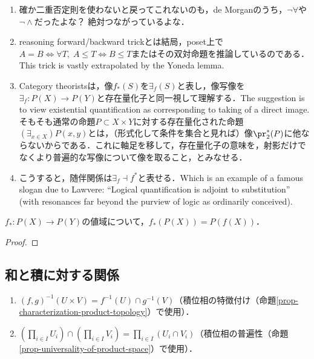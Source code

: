 \documentclass[uplatex,dvipdfmx]{jsreport}
\begin{document}
\begin{remarks}\mbox{}
    \begin{enumerate}
        \item 確か二重否定則を使わないと戻ってこれないのも，de Morganのうち，$\lnot\forall$や$\lnot\land$だったよな？
        絶対つながっているよな．
        \item reasoning forward/backward trickとは結局，poset上で$A=B\iff\forall T,\;A\le T\Leftrightarrow B\le T$またはその双対命題を推論しているのである．This trick is vastly extrapolated by the Yoneda lemma.
        \item Category theoristsは，像$f_*(S)$を$\exists_f(S)$と表し，像写像を$\exists_f:P(X)\to P(Y)$と存在量化子と同一視して理解する．The suggestion is to view existential quantification as corresponding to taking of a direct image. そもそも通常の命題$P\subset X\times Y$に対する存在量化された命題$(\exists_{x\in X}) P(x,y)$とは，（形式化して条件を集合と見れば）像$\pr_2^*(P)$に他ならないからである．これに軸足を移して，存在量化子の意味を，射影だけでなくより普遍的な写像について像を取ること，とみなせる．
        \item こうすると，随伴関係は$\exists_f\dashv f^*$と表せる．Which is an example of a famous slogan due to Lawvere: “Logical quantification is adjoint to substitution” (with resonances far beyond the purview of logic as ordinarily conceived).
    \end{enumerate}
\end{remarks}

\begin{problem}[A2.5.3]
    $f_*:P(X)\to P(Y)$の値域について，$f_*(P(X))=P(f(X))$．
\end{problem}
\begin{proof}
    
\end{proof}

\subsection{和と積に対する関係}

\begin{lemma}\mbox{}\label{lemma-preimage-and-product}
    \begin{enumerate}
        \item $(f,g)^{-1}(U\times V)=f^{-1}(U)\cap g^{-1}(V)$（積位相の特徴付け（命題\ref{prop-characterization-product-topology}）で使用）．
        \item $(\prod_{i\in I}U_i)\cap(\prod_{i\in I}V_i)=\prod_{i\in I}(U_i\cap V_i)$（積位相の普遍性（命題\ref{prop-universality-of-product-space}）で使用）．
    \end{enumerate}
\end{lemma}
\end{document}
